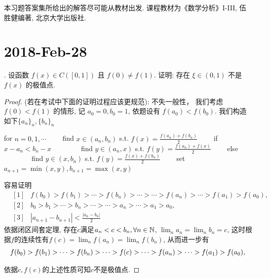 \documentclass[a4paper,12pt]{article}
\author{龙子超}
\title{{\heiti {\zihao{3} 数学分析II-习题课}}}
\date{}
\theoremstyle{nonumberplain}
\begin{document}
\maketitle
%


本习题答案集所给出的解答尽可能从教材出发. 课程教材为《数学分析》I-III, 伍胜健编著,
北京大学出版社.
\section*{2018-Feb-28}
. 设函数 $f(x)\in C([0,1])$ 且 $f(0)\neq f(1)$. 
证明: 存在 $\xi\in(0,1)$ 不是 $f(x)$ 的极值点.
  \begin{proof}
(若在考试中下面的证明过程应该更规范): 不失一般性，
我们考虑 $f(0)<f(1)$ 的情形, 记 $a_0=0,b_0=1$, 依题设有 $f(a_0)<f(b_0)$. 
我们构造如下$\{a_n\}_n,\{b_n\}_n$
\begin{algorithm}
  \begin{algorithmic}
    \State for $n=0,1,\cdots$
    \State \ \ \ \ find $x\in(a_n,b_n)$ s.t. $f(x)=\frac{f(a_n)+f(b_n)}{2}$
    \State \ \ \ \ if $x-a_n<b_n-x$
    \State \ \ \ \ \ \ \ \ find $y\in(a_n,x)$ s.t. $f(y)=\frac{f(a_n)+f(x)}{2}$
    \State \ \ \ \ else 
    \State \ \ \ \ \ \ \ \ find $y\in(x,b_n)$ s.t. $f(y)=\frac{f(x)+f(b_n)}{2}$
    \State \ \ \ \ set $a_{n+1}=\min(x,y),b_{n+1}=\max(x,y)$
  \end{algorithmic}
\end{algorithm}

容易证明
\begin{eqnarray*}
  &[1]&f(b_0)>f(b_1)>\cdots>f(b_n)>\cdots>\cdots>f(a_n)>\cdots>f(a_1)>f(a_0),\\
  &[2]&b_0>b_1>\cdots>b_n>\cdots>\cdots>a_n>\cdots>a_1>a_0,\\
  &[3]&|a_{n+1}-b_{n+1}|<\frac{|a_n-b_n|}{2}
\end{eqnarray*}
依据闭区间套定理, 存在$c$满足$a_n<c<b_n,\forall n\in \mathbb{N}$, $\lim_n a_n=\lim_n b_n=c$, 
这时根据$f$的连续性有$f(c)=\lim_n f(a_n)=\lim_nf(b_n)$, 从而进一步有
\[
  f(b_0)>f(b_1)>\cdots>f(b_n)>\cdots>f(c)>\cdots>f(a_n)>\cdots>f(a_1)>f(a_0),\\
\]

依据$c,f(c)$的上述性质可知$c$不是极值点.
  \end{proof}
\end{document}
